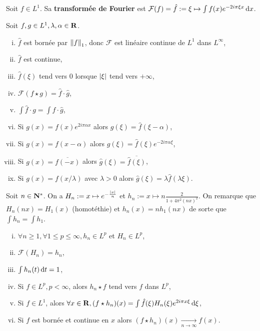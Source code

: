 \begin{defn}
	Soit $f \in L^1$.
	Sa \textbf{transformée de Fourier} est $\mathcal{F}(f) = \hat{f} := \xi \mapsto \int f(x) e^{-2i\pi \xi x} \mathop{}\mathopen{}\mathrm{d} x$.
\end{defn}

\begin{pop}
	Soit $f,g \in L^1, \lambda,\alpha \in \mathbf{R}$.
	\begin{enumerate}[(i)]
		\item $\hat{f}$ est bornée par $\left\lVert f\right\rVert_1$, donc $\mathcal{F}$ est linéaire continue de $L^1$ dans $L^\infty$,
		\item $\hat{f}$ est continue,
		\item $\hat{f}(\xi)$ tend vers $0$ lorsque $\left\lvert\xi\right\rvert$ tend vers $+\infty$,
		\item $\mathcal{F}(f \star g) = \hat{f} \cdot \hat{g}$,
		\item $\int \hat{f} \cdot g = \int f \cdot \hat{g}$,
		\item Si $g(x) = f(x) e^{2i\pi \alpha x}$ alors $\hat{g}(\xi) = \hat{f}(\xi - \alpha)$,
		\item Si $g(x) = f(x - \alpha)$ alors $\hat{g}(\xi) = \hat{f}(\xi) e^{-2i\pi \alpha \xi}$,
		\item Si $g(x) = \overline{f(-x)}$ alors $\hat{g}(\xi) = \overline{\hat{f}(\xi)}$,
		\item Si $g(x) = f(x / \lambda)$ avec $\lambda > 0$ alors $\hat{g}(\xi) = \lambda \hat{f}(\lambda \xi)$.
	\end{enumerate}
\end{pop}

\begin{defn}
	Soit $n \in \mathbf{N}^*$.
	On a $H_n := x \mapsto e^{-\frac{\left\lvert x\right\rvert}{n}}$ et $h_n := x \mapsto n \frac{2}{1 + 4\pi^2 (nx)^2}$.
	On remarque que $H_n(nx) = H_1(x)$ (homotéthie) et $h_n(x) = n h_1(nx)$ de sorte que $\int h_n = \int h_1$.
\end{defn}

\begin{pop}
	\begin{enumerate}[(i)]
		\item $\forall n \geq 1, \forall 1 \leq p \leq \infty, h_n \in L^p$ et $H_n \in L^p$,
		\item $\mathcal{F}(H_n) = h_n$,
		\item $\int h_n(t) \mathop{}\mathopen{}\mathrm{d} t = 1$,
		\item Si $f \in L^p, p < \infty$, alors $h_n \star f$ tend vers $f$ dans $L^p$,
		\item Si $f \in L^1$, alors $\forall x \in \mathbf{R}, (f \star h_n)(x) = \int \hat{f}(\xi) H_n(\xi) e^{2i\pi x \xi} \mathop{}\mathopen{}\mathrm{d} \xi$,
		\item Si $f$ est bornée et continue en $x$ alors $(f \star h_n)(x) \underset{n \to \infty}{\longrightarrow} f(x)$.
	\end{enumerate}
\end{pop}

